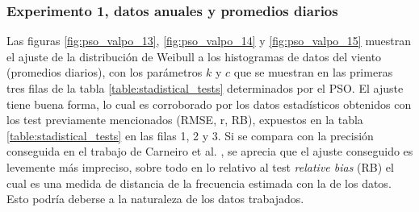 \subsubsection{Experimento 1, datos anuales y promedios diarios}
Las figuras \ref{fig:pso_valpo_13}, \ref{fig:pso_valpo_14} y \ref{fig:pso_valpo_15} muestran el ajuste de la distribución de Weibull a los histogramas de datos del viento (promedios diarios), con los parámetros $k$ y $c$  que se muestran en las primeras tres filas de la tabla \ref{table:stadistical_tests} determinados por el PSO. El ajuste tiene buena forma, lo cual es corroborado por los datos estadísticos obtenidos con los test previamente mencionados (RMSE, r, RB), expuestos en la tabla \ref{table:stadistical_tests} en las filas 1, 2 y 3. Si se compara con la precisión conseguida en el trabajo de Carneiro et al. \cite{Carneiro15}, se aprecia que el ajuste conseguido es levemente más impreciso, sobre todo en lo relativo al test \emph{relative bias} (RB) el cual es una medida de distancia de la frecuencia estimada con la de los datos. Esto podría deberse a la naturaleza de los datos 
trabajados.\\
